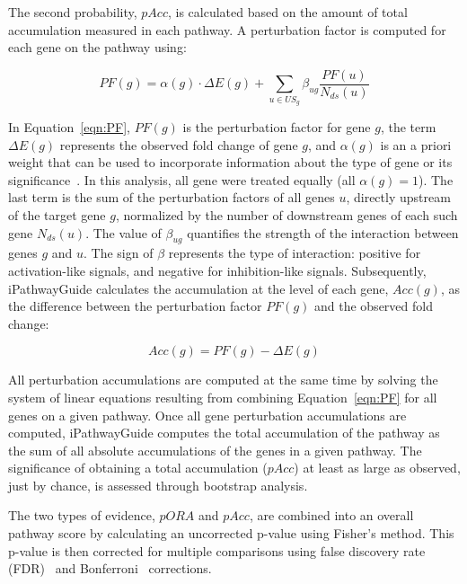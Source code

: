 \documentclass[Minh_PhD_thesis.tex]{subfiles}
\begin{document}
The second probability, $pAcc$, is calculated based on the amount of total accumulation measured in each pathway. A perturbation factor is computed for each gene on the pathway using:

\begin{equation}
\label{eqn:PF}
PF(g) = \alpha(g) \cdot \Delta E(g) + \sum_{u \in US_g} \beta_{ug}\frac{PF(u)}{N_{ds}(u)}
\end{equation}


In Equation~\ref{eqn:PF}, $PF(g)$ is the perturbation factor for gene $g$, the term $\Delta E(g)$ represents the observed fold change of gene $g$, and $\alpha(g)$ is an a priori weight that can be used to incorporate information about the type of gene or its significance~\cite{voichita2012incorporating}. In this analysis, all gene were treated equally (all $\alpha(g)=1$). The last term is the sum of the perturbation factors of all genes $u$, directly upstream of the target gene $g$, normalized by the number of downstream genes of each such gene $N_{ds}(u)$. The value of $\beta_{ug}$ quantifies the strength of the interaction between genes $g$ and $u$. The sign of $\beta$ represents the type of interaction: positive for activation-like signals, and negative for inhibition-like signals. Subsequently, iPathwayGuide calculates the accumulation at the level of each gene, $Acc(g)$, as the difference between the perturbation factor $PF(g)$ and the observed fold change:

\begin{equation}
Acc(g) = PF(g) - \Delta E(g)
\label{eqn:acc}
\end{equation}

All perturbation accumulations are computed at the same time by solving the system of linear equations resulting from combining Equation~\ref{eqn:PF} for all genes on a given pathway. Once all gene perturbation accumulations are computed, iPathwayGuide computes the total accumulation of the pathway as the sum of all absolute accumulations of the genes in a given pathway. The significance of obtaining a total accumulation ($pAcc$) at least as large as observed, just by chance, is assessed through bootstrap analysis.

The two types of evidence, $pORA$ and $pAcc$, are combined into an overall pathway score by calculating an uncorrected p-value using Fisher's method. This p-value is then corrected for multiple comparisons using false discovery rate (FDR)~\cite{Benjamini:1995,  Benjamini:2001} and Bonferroni~\cite{Bonferroni:1935} corrections. 
\end{document}
